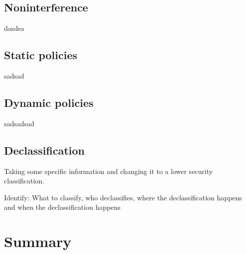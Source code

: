 \subsection{Noninterference}
dasdsa

\subsection{Static policies}


sadsad
\subsection{Dynamic policies}
sadsadsad


\subsection{Declassification}
Taking some specific information and changing it to a lower security classification.

Identify: What to classify, who declassifies, where the declassification happens and when the declassification happens

\section{Summary}
